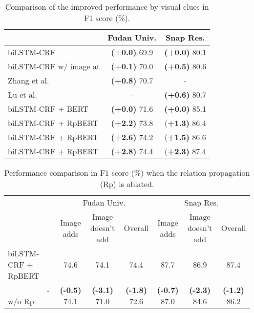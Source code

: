 \documentclass[letterpaper]{article} \usepackage{aaai21}  \usepackage{times}  \usepackage{helvet} \usepackage{courier}  \usepackage[hyphens]{url}  \usepackage{graphicx} \urlstyle{rm} \def\UrlFont{\rm}  \usepackage{natbib}  \usepackage{caption} \frenchspacing  \setlength{\pdfpagewidth}{8.5in}  \setlength{\pdfpageheight}{11in}
\begin{document}
\begin{table}[tb]

\centering
\small
\begin{tabular}{|l|cc|} 
  \hline
&  Fudan  Univ. &  Snap  Res. \\
\hline
biLSTM-CRF & \textbf{(+0.0)} 69.9& \textbf{(+0.0)} 80.1  \\ 
			biLSTM-CRF w/ image at  & \textbf{(+0.1)} 70.0& \textbf{(+0.5)} 80.6 \\ 
			Zhang et al.~\shortcite{zhang2018adaptive}  & \textbf{(+0.8)} 70.7 & - \\ 
			Lu et al.~\shortcite{lu2018visual} & - & \textbf{(+0.6)} 80.7 \\ 
			\hline
biLSTM-CRF + BERT &\textbf{(+0.0)} 71.6& \textbf{(+0.0)} 85.1  \\ 
biLSTM-CRF + RpBERT &\textbf{(+2.2)} 73.8& (\textbf{+1.3)} 86.4   \\ 
			biLSTM-CRF + RpBERT  &\textbf{(+2.6)} 74.2& (\textbf{+1.5)} 86.6   \\ 
			biLSTM-CRF + RpBERT  &\textbf{(+2.8)} 74.4& (\textbf{+2.3)} 87.4   \\ 
\hline
\end{tabular}
\caption{Comparison of the improved performance by visual clues in F1 score (\%).}\label{tab:CompNER}
\end{table}



\setcounter{table}{5}

\begin{table*}[tb]

\centering
\small
\begin{tabular}{|l|ccc|ccc|} 

	\hline
&  \multicolumn{3}{c|}{Fudan Univ.} &  \multicolumn{3}{c|}{Snap Res.} \\\cline{2-7}
				& Image adds &Image doesn't add & Overall & Image adds & Image doesn't add & Overall   \\
\hline
biLSTM-CRF + RpBERT & 74.6  & 74.1  & 74.4 & 87.7  & 86.9 & 87.4\\			
		  ~~~~~~~~~~- w/o Rp &\textbf{(-0.5)} 74.1& \textbf{(-3.1)} 71.0& \textbf{(-1.8)} 72.6 & \textbf{(-0.7)} 87.0& \textbf{(-2.3)}  84.6 & \textbf{(-1.2)} 86.2 \\
\hline
\end{tabular}
\caption{Performance comparison in F1 score (\%) when the relation propagation (Rp) is ablated.}\label{tab:RGNAblated}
\end{table*}
\end{document}
